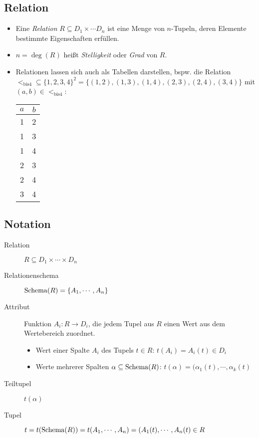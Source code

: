         \subsection{Relation} %
            \begin{itemize}
            	\item Eine \textit{Relation} \( R \subseteq D _ 1 \times \cdots D _ n \) ist eine Menge von \(n\)-Tupeln, deren Elemente bestimmte Eigenschaften erfüllen.
            	\item \( n = \deg(R) \) heißt \textit{Stelligkeit} oder \textit{Grad} von \(R\).
            	\item Relationen lassen sich auch als Tabellen darstellen, bspw. die Relation \\ \( < _ \text{bis4} \subseteq \{ 1, 2, 3, 4 \} ^ 2 = \{ (1, 2), (1, 3), (1, 4), (2, 3), (2, 4), (3, 4) \} \) mit \( (a, b) \in < _ \text{bis4} \):
            		\begin{table}[H]
            			\centering
            			\begin{tabular}{c | c}
            				\(a\) & \(b\) \\ \hline
            				  1   & 2     \\
            				  1   & 3     \\
            				  1   & 4     \\
            				  2   & 3     \\
            				  2   & 4     \\
            				  3   & 4
            			\end{tabular}
            		\end{table}
            \end{itemize}

        \subsection{Notation} %
            \begin{description}
            	\item[Relation] \( R \subseteq D _ 1 \times \cdots \times D _ n \)
            	\item[Relationenschema] \( \operatorname{Schema}(R) = \{ A _ 1, \cdots, A _ n \} \)
            	\item[Attribut] Funktion \( A _ i : R \rightarrow D _ i \), die jedem Tupel aus \(R\) einen Wert aus dem Wertebereich zuordnet.
            		\begin{itemize}
            			\item Wert einer Spalte \(A_i\) des Tupels \( t \in R \): \( t(A_i) = A_i(t) \in D_i \)
            			\item Werte mehrerer Spalten \( \alpha \subseteq \operatorname{Schema}(R) \): \( t(\alpha) = (\alpha_1(t), \cdots, \alpha_k(t) \)
            		\end{itemize}
            	\item[Teiltupel] \(t(\alpha)\)
            	\item[Tupel] \( t = t(\operatorname{Schema}(R)) = t(A_1, \cdots, A_n) = (A_1(t), \cdots, A_n(t) \in R \)
            \end{description}

